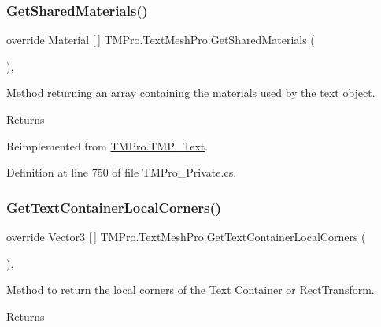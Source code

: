 \subsubsection{\texorpdfstring{GetSharedMaterials()}{GetSharedMaterials()}}
{\footnotesize\ttfamily override Material \mbox{[}$\,$\mbox{]} T\+M\+Pro.\+Text\+Mesh\+Pro.\+Get\+Shared\+Materials (\begin{DoxyParamCaption}{ }\end{DoxyParamCaption})\hspace{0.3cm}{\ttfamily [protected]}, {\ttfamily [virtual]}}



Method returning an array containing the materials used by the text object. 

\begin{DoxyReturn}{Returns}

\end{DoxyReturn}


Reimplemented from \mbox{\hyperlink{class_t_m_pro_1_1_t_m_p___text_a187cdc5ab36e0006fa0516f208a3cffd}{T\+M\+Pro.\+T\+M\+P\+\_\+\+Text}}.



Definition at line 750 of file T\+M\+Pro\+\_\+\+Private.\+cs.

\mbox{\label{class_t_m_pro_1_1_text_mesh_pro_ab19c47a7d65e5e1201978568ed1af0d5}} 
\subsubsection{\texorpdfstring{GetTextContainerLocalCorners()}{GetTextContainerLocalCorners()}}
{\footnotesize\ttfamily override Vector3 \mbox{[}$\,$\mbox{]} T\+M\+Pro.\+Text\+Mesh\+Pro.\+Get\+Text\+Container\+Local\+Corners (\begin{DoxyParamCaption}{ }\end{DoxyParamCaption})\hspace{0.3cm}{\ttfamily [protected]}, {\ttfamily [virtual]}}



Method to return the local corners of the Text Container or Rect\+Transform. 

\begin{DoxyReturn}{Returns}

\end{DoxyReturn}


